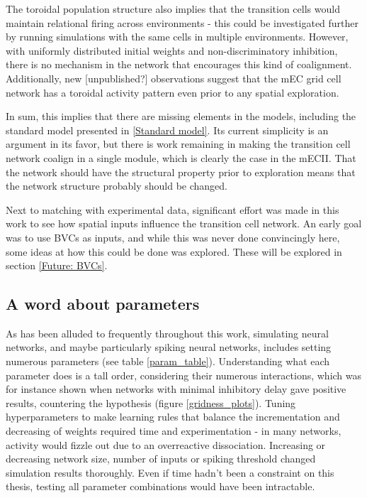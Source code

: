 \documentclass{article}
\begin{document}
    The toroidal population structure also implies that the transition cells would maintain relational firing across environments - this could be investigated further by running simulations with the same cells in multiple environments. However, with uniformly distributed initial weights and non-discriminatory inhibition, there is no mechanism in the network that encourages this kind of coalignment. Additionally, new [unpublished?] observations suggest that the mEC grid cell network has a toroidal activity pattern even prior to any spatial exploration.

    In sum, this implies that there are missing elements in the models, including the standard model presented in \ref{Standard model}. Its current simplicity is an argument in its favor, but there is work remaining in making the transition cell network coalign in a single module, which is clearly the case in the mECII. That the network should have the structural property prior to exploration means that the network structure probably should be changed.

    Next to matching with experimental data, significant effort was made in this work to see how spatial inputs influence the transition cell network. An early goal was to use BVCs as inputs, and while this was never done convincingly here, some ideas at how this could be done was explored. These will be explored in section \ref{Future: BVCs}.

    \subsection{A word about parameters}\label{ParameterDiscussion}

    As has been alluded to frequently throughout this work, simulating neural networks, and maybe particularly spiking neural networks, includes setting numerous parameters (see table \ref{param_table}). Understanding what each parameter does is a tall order, considering their numerous interactions, which was for instance shown when networks with minimal inhibitory delay gave positive results, countering the hypothesis (figure \ref{gridness_plots}). Tuning hyperparameters to make learning rules that balance the incrementation and decreasing of weights required time and experimentation - in many networks, activity would fizzle out due to an overreactive dissociation. Increasing or decreasing network size, number of inputs or spiking threshold changed simulation results thoroughly. Even if time hadn't been a constraint on this thesis, testing all parameter combinations would have been intractable.
\end{document}
